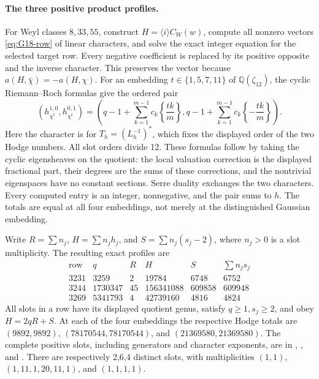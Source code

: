 \paragraph{The three positive product profiles.}
For Weyl classes \(8,33,55\), construct
\(H=\langle i\rangle C_W(w)\), compute all nonzero vectors
\eqref{eq:G18-row} of linear characters, and solve the exact integer
equation for the selected target row. Every negative coefficient is
replaced by its positive opposite and the inverse character.
This preserves the vector because \(a(H,\bar\chi)=-a(H,\chi)\).
For an embedding \(t\in\{1,5,7,11\}\) of \(\mathbb Q(\zeta_{12})\),
the cyclic Riemann--Roch formulas give the ordered pair
\[
 (h^{1,0}_{\chi^t},h^{0,1}_{\chi^t})
 =\left(q-1+\sum_{k=1}^{m-1}c_k\left\{\frac{tk}{m}\right\},
        q-1+\sum_{k=1}^{m-1}c_k\left\{-\frac{tk}{m}\right\}\right).
\]
Here the character is for \(T_h=(L_h^{-1})^*\), which fixes the
displayed order of the two Hodge numbers. All slot orders divide 12.
These formulas follow by taking the
cyclic eigensheaves on the quotient: the local valuation correction
is the displayed fractional part, their degrees are the sums of
these corrections, and the nontrivial eigenspaces have no constant
sections. Serre duality exchanges the two characters.
Every computed entry is an integer, nonnegative, and the pair sums to
\(h\). The totals are equal at all four embeddings, not merely at
the distinguished Gaussian embedding.

Write \(R=\sum n_j\), \(H=\sum n_jh_j\), and
\(S=\sum n_j(s_j-2)\), where \(n_j>0\) is a slot multiplicity.
The resulting exact profiles are
\[
\begin{array}{c|r|r|r|r|r}
\text{row}&q&R&H&S&\sum n_js_j\\\hline
3231&3259&2&19784&6748&6752\\
3244&1730347&45&156341088&609858&609948\\
3269&5341793&4&42739160&4816&4824
\end{array}
\]
All slots in a row have its displayed quotient genus, satisfy
\(q\ge1,s_j\ge2\), and obey \(H=2qR+S\).
At each of the four embeddings the respective Hodge totals are
\((9892,9892)\), \((78170544,78170544)\), and
\((21369580,21369580)\).
The complete positive slots, including generators and character
exponents, are in ,
, and .
There are respectively 2,6,4 distinct slots, with multiplicities
\((1,1)\), \((1,11,1,20,11,1)\), and \((1,1,1,1)\).

